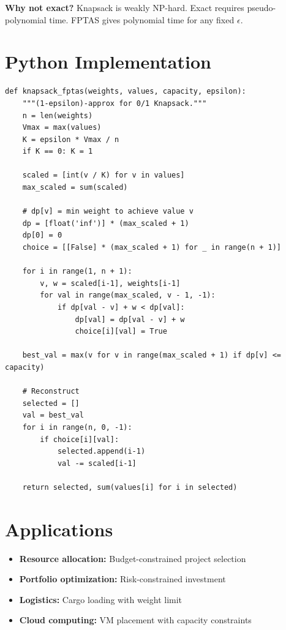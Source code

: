 \documentclass[11pt,oneside]{book}
\begin{document}
\textbf{Why not exact?} Knapsack is weakly NP-hard. Exact requires pseudo-polynomial time. FPTAS gives polynomial time for any fixed $\epsilon$.

\section{Python Implementation}

\begin{lstlisting}[style=python, caption=Knapsack FPTAS]
def knapsack_fptas(weights, values, capacity, epsilon):
    """(1-epsilon)-approx for 0/1 Knapsack."""
    n = len(weights)
    Vmax = max(values)
    K = epsilon * Vmax / n
    if K == 0: K = 1
    
    scaled = [int(v / K) for v in values]
    max_scaled = sum(scaled)
    
    # dp[v] = min weight to achieve value v
    dp = [float('inf')] * (max_scaled + 1)
    dp[0] = 0
    choice = [[False] * (max_scaled + 1) for _ in range(n + 1)]
    
    for i in range(1, n + 1):
        v, w = scaled[i-1], weights[i-1]
        for val in range(max_scaled, v - 1, -1):
            if dp[val - v] + w < dp[val]:
                dp[val] = dp[val - v] + w
                choice[i][val] = True
    
    best_val = max(v for v in range(max_scaled + 1) if dp[v] <= capacity)
    
    # Reconstruct
    selected = []
    val = best_val
    for i in range(n, 0, -1):
        if choice[i][val]:
            selected.append(i-1)
            val -= scaled[i-1]
    
    return selected, sum(values[i] for i in selected)
\end{lstlisting}

\section{Applications}
\begin{itemize}
    \item \textbf{Resource allocation:} Budget-constrained project selection
    \item \textbf{Portfolio optimization:} Risk-constrained investment
    \item \textbf{Logistics:} Cargo loading with weight limit
    \item \textbf{Cloud computing:} VM placement with capacity constraints
\end{itemize}
\end{document}

